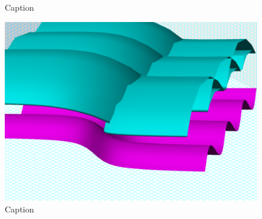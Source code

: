 \begin{figure}[H]
\begin{minipage}[b]{0.5\linewidth}
    \caption{Caption} 
    \label{fig:fig46}
    \vspace{4ex}
  \end{minipage} %
  \begin{minipage}[b]{0.5\linewidth}
    \centering
    \includegraphics[width=.9\linewidth]{surfaces-img/Fig 47.png} 
    \caption{Caption} 
    \label{fig:fig47}
    \vspace{4ex}
  \end{minipage} %
\end{figure}